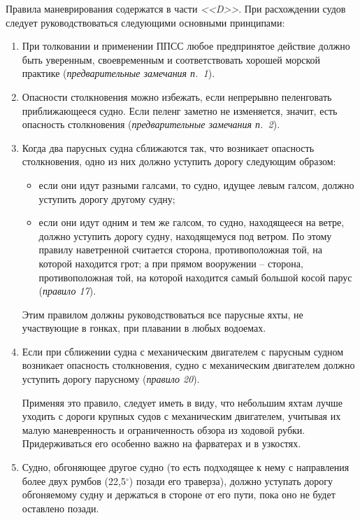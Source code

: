 \documentclass[a4paper, 12pt, twoside, final]{scrbook}
\begin{document}
Правила маневрирования содержатся в части \textit{<<D>>}. При расхождении судов следует руководствоваться следующими основными принципами:

\begin{enumerate}
\item При толковании и применении ППСС любое предпринятое действие должно быть уверенным, своевременным и соответствовать хорошей морской практике (\textit{предварительные замечания п.~1}).
\item Опасности столкновения можно избежать, если непрерывно пеленговать приближающееся судно. Если пеленг заметно не изменяется, значит, есть опасность столкновения (\textit{предварительные замечания п.~2}).
\item Когда два парусных судна сближаются так, что возникает опасность столкновения, одно из них должно уступить дорогу следующим образом:

\begin{itemize}
\item если они идут разными галсами, то судно, идущее левым галсом, должно уступить дорогу другому судну;
\item если они идут одним и тем же галсом, то судно, находящееся на ветре, должно уступить дорогу судну, находящемуся под ветром. По этому правилу наветренной считается сторона, противоположная той, на которой находится грот; а при прямом вооружении \--- сторона, противоположная той, на которой находится самый большой косой парус (\textit{правило 17}).
\end{itemize}

Этим правилом должны руководствоваться все парусные яхты, не участвующие в гонках, при плавании в любых водоемах.
\item Если при сближении судна с механическим двигателем с парусным судном возникает опасность столкновения, судно с механическим двигателем должно уступить дорогу парусному (\textit{правило 20}).

Применяя это правило, следует иметь в виду, что небольшим яхтам лучше уходить с дороги крупных судов с механическим двигателем, учитывая их малую маневренность и ограниченность обзора из ходовой рубки. Придерживаться его особенно важно на фарватерах и в узкостях.

\item Судно, обгоняющее другое судно (то есть подходящее к нему с направления более двух румбов (22,5$^\circ$) позади его траверза), должно уступать дорогу обгоняемому судну и держаться в стороне от его пути, пока оно не будет оставлено позади.


\end{enumerate}
\end{document}
